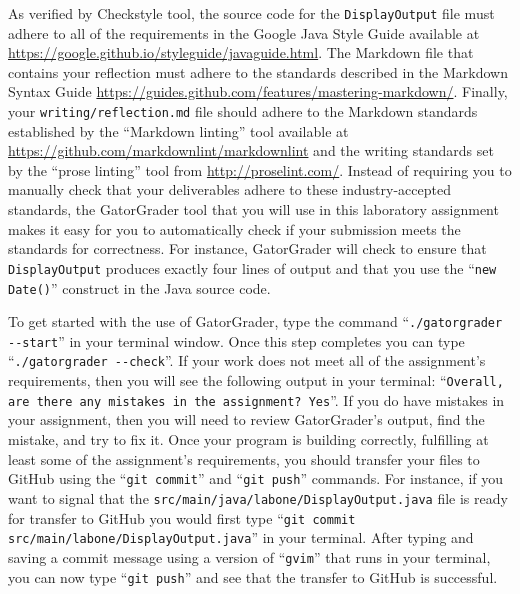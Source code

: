 \documentclass[11pt]{article}
\newcommand{\mainprogram}{\lstinline{DisplayOutput}}
\newcommand{\mainprogramsource}{\lstinline{src/main/java/labone/DisplayOutput.java}}
\newcommand{\reflection}{\lstinline{writing/reflection.md}}
\newcommand{\gatorgraderstart}{\command{./gatorgrader --start}}
\newcommand{\gatorgradercheck}{\command{./gatorgrader --check}}
\newcommand{\gitcommitfile}[1]{\command{git commit #1}}
\newcommand{\gitcommit}{\command{git commit}}
\newcommand{\gitpush}{\command{git push}}
\newcommand{\command}[1]{``\lstinline{#1}''}
\newcommand{\step}[1]{``{#1}''}
\begin{document}
As verified by Checkstyle tool, the source code for the \mainprogram{} file must adhere to all of the requirements in
the Google Java Style Guide available at \url{https://google.github.io/styleguide/javaguide.html}. The Markdown file
that contains your reflection must adhere to the standards described in the Markdown Syntax Guide
\url{https://guides.github.com/features/mastering-markdown/}. Finally, your \reflection{} file should adhere to the
Markdown standards established by the \step{Markdown linting} tool available at
\url{https://github.com/markdownlint/markdownlint} and the writing standards set by the \step{prose linting} tool from
\url{http://proselint.com/}. Instead of requiring you to manually check that your deliverables adhere to these
industry-accepted standards, the GatorGrader tool that you will use in this laboratory assignment makes it easy for you
to automatically check if your submission meets the standards for correctness. For instance, GatorGrader will check to
ensure that \mainprogram{} produces exactly four lines of output and that you use the \command{new Date()} construct in
the Java source code.

To get started with the use of GatorGrader, type the command \gatorgraderstart{} in your terminal window. Once this step
completes you can type \gatorgradercheck{}. If your work does not meet all of the assignment's requirements, then you
will see the following output in your terminal: \command{Overall, are there any mistakes in the assignment? Yes}. If you
do have mistakes in your assignment, then you will need to review GatorGrader's output, find the mistake, and try to fix
it. Once your program is building correctly, fulfilling at least some of the assignment's requirements, you should
transfer your files to GitHub using the \gitcommit{} and \gitpush{} commands. For instance, if you want to signal that
the \mainprogramsource{} file is ready for transfer to GitHub you would first type
\gitcommitfile{src/main/labone/DisplayOutput.java} in your terminal. After typing and saving a commit message using a
version of \command{gvim} that runs in your terminal, you can now type \gitpush{} and see that the transfer to GitHub is
successful.
\end{document}
